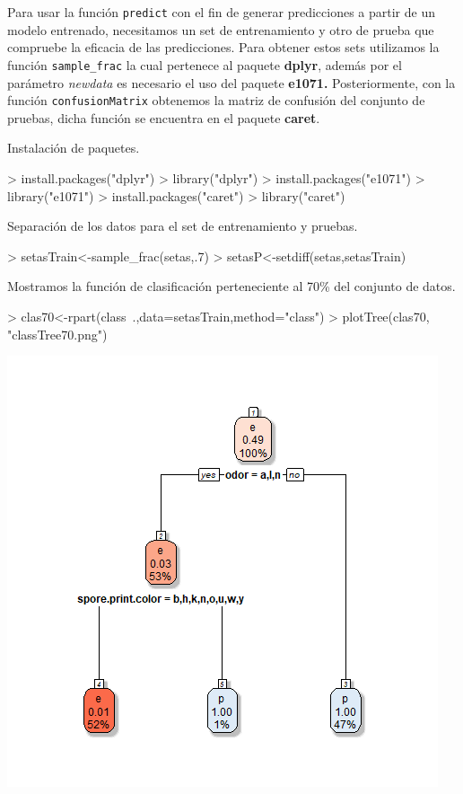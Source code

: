 \documentclass [a4paper] {article}
\begin{document}
\bigskip
Para usar la función \texttt{predict} con el fin de generar predicciones a partir de un modelo entrenado, necesitamos
un set de entrenamiento y otro de prueba que compruebe la eficacia de las predicciones. Para obtener estos sets utilizamos
la función \texttt{sample\_frac} la cual pertenece al paquete \textbf{dplyr}, además por el parámetro \textit{newdata} es
necesario el uso del paquete \textbf{e1071.} Posteriormente, con la función \texttt{confusionMatrix} obtenemos la matriz de
confusión del conjunto de pruebas, dicha función se encuentra en el paquete \textbf{caret}.

\bigskip
Instalación de paquetes.
\begin{Schunk}
\begin{Sinput}
> install.packages("dplyr")
> library("dplyr")
> install.packages("e1071")
> library("e1071")
> install.packages("caret")
> library("caret")
\end{Sinput}
\end{Schunk}

\bigskip
Separación de los datos para el set de entrenamiento y pruebas.
\begin{Schunk}
\begin{Sinput}
> setasTrain<-sample_frac(setas,.7)
> setasP<-setdiff(setas,setasTrain)
\end{Sinput}
\end{Schunk}

\bigskip
Mostramos la función de clasificación perteneciente al 70\% del conjunto de datos.
\begin{Schunk}
\begin{Sinput}
> clas70<-rpart(class~.,data=setasTrain,method="class")
> plotTree(clas70, "classTree70.png")
\end{Sinput}
\end{Schunk}
\includegraphics[width=\textwidth]{classTree70}
\end{document}
